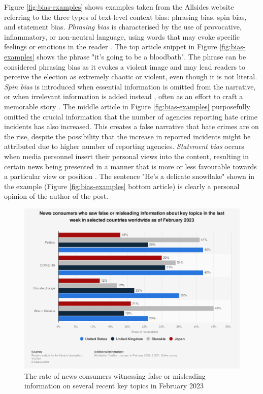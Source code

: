 Figure \ref{fig:bias-examples} shows examples taken from the Allsides website \cite{allsides-media-bias-types} referring to the three types of text-level context bias: phrasing bias, spin bias, and statement bias. \textit{Phrasing bias} is characterised by the use of provocative, inflammatory, or non-neutral language, using words that may evoke specific feelings or emotions in the reader \cite{spinde-2024-taxonomy,hube-2019-neural-biased-language}. The top article snippet in Figure \ref{fig:bias-examples} shows the phrase "it's going to be a bloodbath". The phrase can be considered phrasing bias as it evokes a violent image and may lead readers to perceive the election as extremely chaotic or violent, even though it is not literal. \textit{Spin bias} is introduced when essential information is omitted from the narrative, or when irrelevant information is added instead \cite{spinde-2024-taxonomy}, often as an effort to craft a memorable story \cite{mullainathan-2002-media-bias}. The middle article in Figure \ref{fig:bias-examples} purposefully omitted the crucial information that the number of agencies reporting hate crime incidents has also increased. This creates a false narrative that hate crimes are on the rise, despite the possibility that the increase in reported incidents might be attributed due to higher number of reporting agencies. \textit{Statement bias} occurs when media personnel insert their personal views into the content, resulting in certain news being presented in a manner that is more or less favourable towards a particular view or position \cite{spinde-2024-taxonomy,d-alessio-2000-meta-analysis}. The sentence "He's a delicate snowflake" shown in the example (Figure \ref{fig:bias-examples} bottom article) is clearly a personal opinion of the author of the post.

\begin{figure}[htbp]
    \centering
    \includegraphics[width=0.7\linewidth]{images/statistic_id1317019_consumers-witnessing-false-information-on-certain-topics-worldwide-2023.png}
    \caption{The rate of news consumers witnessing false or misleading information on several recent key topics in February 2023 \cite{reuters-2023-false-info}}
    \label{fig:consumers-witnessing-false-information-on-certain-topics-worldwide-2023}
\end{figure}


